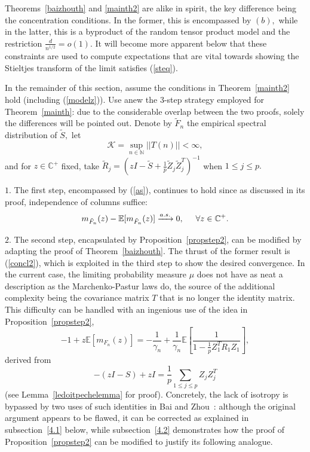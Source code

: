 \documentclass{article}
\numberwithin{equation}{section}
\begin{document}

Theorems~\ref{baizhouth} and \ref{mainth2} are alike in spirit, the key difference being the concentration conditions. In the former, this is encompassed by \((b),\) while in the latter, this is a byproduct of the random tensor product model and the restriction \(\frac{d}{n^{1/2}}=o(1).\) It will become more apparent below that these constraints are used to compute expectations that are vital towards showing the Stieltjes transform of the limit satisfies (\ref{steq}).
\par
In the remainder of this section, assume the conditions in Theorem~\ref{mainth2} hold (including (\ref{modelz})). %
Use anew the \(3\)-step strategy employed for Theorem~\ref{mainth}: due to the considerable overlap between the two proofs, solely the differences will be pointed out. Denote by \(\tilde{F}_n\) the empirical spectral distribution of \(\tilde{S},\) let 
\begin{equation}\label{bdtop}
    \mathcal{K}=\sup_{n \in \mathbb{N}}{||T(n)||}<\infty,
\end{equation}
and for \(z \in \mathbb{C}^+\) fixed, take \(\tilde{R}_j=(zI-\tilde{S}+\frac{1}{p}\tilde{Z}_j\tilde{Z}^T_j)^{-1}\) when \(1 \leq j \leq p.\)
\par
\(1.\) The first step, encompassed by (\ref{as}), continues to hold since as discussed in its proof, independence of columns suffice:
\[m_{\tilde{F}_n}(z)-\mathbb{E}[m_{\tilde{F}_n}(z)] \xrightarrow[]{a.s.} 0, \hspace{0.5cm} \forall z \in \mathbb{C}^{+}.\]
\par
\(2.\) The second step, encapsulated by Proposition~\ref{propstep2}, can be modified by adapting the proof of Theorem~\ref{baizhouth}. The thrust of the former result is (\ref{concl2}), which is exploited in the third step to show the desired convergence. In the current case, the limiting probability measure \(\mu\) does not have as neat a description as the Marchenko-Pastur laws do,
the source of the additional complexity being the covariance matrix \(T\) that is no longer the identity matrix. This difficulty can be handled with an ingenious use of the idea in Proposition~\ref{propstep2}, 
\[-1+z\mathbb{E}[m_{F_n}(z)]=-\frac{1}{\gamma_n}+\frac{1}{\gamma_n}\mathbb{E}[\frac{1}{1-\frac{1}{p}Z_1^TR_1Z_1}],\]
derived from
\[-(zI-S)+zI=\frac{1}{p}\sum_{1 \leq j \leq p}{Z_jZ_j^T}\]
(see Lemma~\ref{ledoitpechelemma} for proof). Concretely, the lack of isotropy is bypassed by two uses of such identities in Bai and Zhou~\cite{baizhou}: although the original argument appears to be flawed, it can be corrected as explained in subsection~\ref{4.1} below, while subsection~\ref{4.2} demonstrates how the proof of Proposition~\ref{propstep2} can be modified to justify its following analogue.
\end{document}

